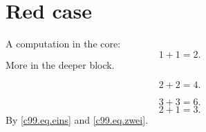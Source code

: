 \chapter{Red case}\label{c99}

A computation in the core:
\begin{equation}\label{c99.eq.eins}
  1 + 1 = 2.
\end{equation}
More in the deeper block.

\begin{vertiefung}[id=c99.v1, titel={Deeper}, wozu={Shows a second computation.},
    voraussetzung={Equation~\eqref{c99.eq.eins}.}, zurueck={It stays at two.}]
  \begin{equation}\label{c99.eq.tief}
    2 + 2 = 4.
  \end{equation}
\end{vertiefung}

\iftpcdepthshown
\begin{equation}\label{c99.eq.extra}
  3 + 3 = 6.
\end{equation}
\fi
\begin{equation}\label{c99.eq.zwei}
  2 + 1 = 3.
\end{equation}
By \eqref{c99.eq.eins} and \eqref{c99.eq.zwei}.
